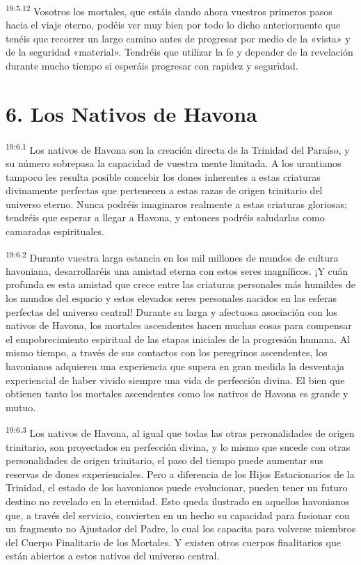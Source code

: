\par
\textsuperscript{19:5.12} Vosotros los mortales, que estáis dando ahora vuestros primeros pasos hacia el viaje eterno, podéis ver muy bien por todo lo dicho anteriormente que tenéis que recorrer un largo camino antes de progresar por medio de la «vista» y de la seguridad «material». Tendréis que utilizar la fe y depender de la revelación durante mucho tiempo si esperáis progresar con rapidez y seguridad.

\section*{6. Los Nativos de Havona}
\par
\textsuperscript{19:6.1} Los nativos de Havona son la creación directa de la Trinidad del Paraíso, y su número sobrepasa la capacidad de vuestra mente limitada. A los urantianos tampoco les resulta posible concebir los dones inherentes a estas criaturas divinamente perfectas que pertenecen a estas razas de origen trinitario del universo eterno. Nunca podréis imaginaros realmente a estas criaturas gloriosas; tendréis que esperar a llegar a Havona, y entonces podréis saludarlas como camaradas espirituales.

\par
\textsuperscript{19:6.2} Durante vuestra larga estancia en los mil millones de mundos de cultura havoniana, desarrollaréis una amistad eterna con estos seres magníficos. ¡Y cuán profunda es esta amistad que crece entre las criaturas personales más humildes de los mundos del espacio y estos elevados seres personales nacidos en las esferas perfectas del universo central! Durante su larga y afectuosa asociación con los nativos de Havona, los mortales ascendentes hacen muchas cosas para compensar el empobrecimiento espiritual de las etapas iniciales de la progresión humana. Al mismo tiempo, a través de sus contactos con los peregrinos ascendentes, los havonianos adquieren una experiencia que supera en gran medida la desventaja experiencial de haber vivido siempre una vida de perfección divina. El bien que obtienen tanto los mortales ascendentes como los nativos de Havona es grande y mutuo.

\par
\textsuperscript{19:6.3} Los nativos de Havona, al igual que todas las otras personalidades de origen trinitario, son proyectados en perfección divina, y lo mismo que sucede con otras personalidades de origen trinitario, el paso del tiempo puede aumentar sus reservas de dones experienciales. Pero a diferencia de los Hijos Estacionarios de la Trinidad, el estado de los havonianos puede evolucionar, pueden tener un futuro destino no revelado en la eternidad. Esto queda ilustrado en aquellos havonianos que, a través del servicio, convierten en un hecho su capacidad para fusionar con un fragmento no Ajustador del Padre, lo cual los capacita para volverse miembros del Cuerpo Finalitario de los Mortales. Y existen otros cuerpos finalitarios que están abiertos a estos nativos del universo central.

